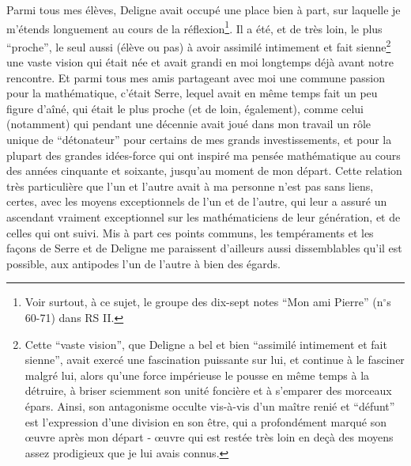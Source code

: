 Parmi tous mes élèves, Deligne avait occupé une place bien à part, sur laquelle je m'étends longuement au cours de la réflexion\footnote{Voir surtout, à ce sujet, le groupe des dix-sept notes ``Mon ami Pierre'' (n$^{\circ}$s 60-71) dans RS II.}. Il a été, et de très loin, le plus ``proche'', le seul aussi (élève ou pas) à avoir assimilé intimement et fait sienne\footnote{Cette ``vaste vision'', que Deligne a bel et bien ``assimilé intimement et fait sienne'', avait exercé une fascination puissante sur lui, et continue à le fasciner malgré lui, alors qu'une force impérieuse le pousse en même temps à la détruire, à briser sciemment son unité foncière et à s'emparer des morceaux épars. Ainsi, son antagonisme occulte vis-à-vis d'un maître renié et ``défunt'' est l'expression d'une division en son être, qui a profondément marqué son œuvre après mon départ - œuvre qui est restée très loin en deçà des moyens assez prodigieux que je lui avais connus.} une vaste vision qui était née et avait grandi en moi longtemps déjà avant notre rencontre. Et parmi tous mes amis partageant avec moi une commune passion pour la mathématique, c'était Serre, lequel avait en même temps fait un peu figure d'aîné, qui était le plus proche (et de loin, également), comme celui (notamment) qui pendant une décennie avait joué dans mon travail un rôle unique de ``détonateur'' pour certains de mes grands investissements, et pour la plupart des grandes idées-force qui ont inspiré ma pensée mathématique au cours des années cinquante et soixante, jusqu'au moment de mon départ. Cette relation très particulière que l'un et l'autre avait à ma personne n'est pas sans liens, certes, avec les moyens exceptionnels de l'un et de l'autre, qui leur a assuré un ascendant vraiment exceptionnel sur les mathématiciens de leur génération, et de celles qui ont suivi. Mis à part ces points communs, les tempéraments et les façons de Serre et de Deligne me paraissent d'ailleurs aussi dissemblables qu'il est possible, aux antipodes l'un de l'autre à bien des égards.

